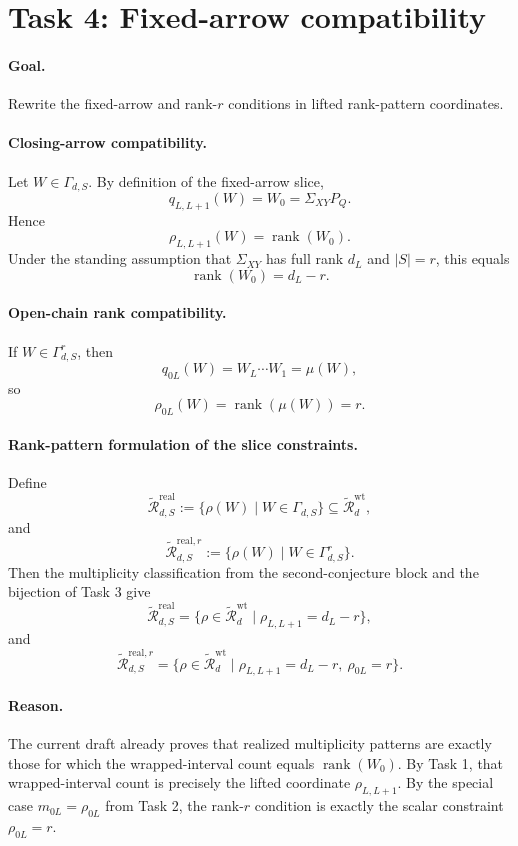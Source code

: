 \section*{Task 4: Fixed-arrow compatibility}

\paragraph{Goal.}
Rewrite the fixed-arrow and rank-\(r\) conditions in lifted rank-pattern
coordinates.

\paragraph{Closing-arrow compatibility.}
Let \(W\in \Gamma_{d,S}\). By definition of the fixed-arrow slice,
\[
q_{L,L+1}(W)=W_0=\Sigma_{XY}P_Q.
\]
Hence
\[
\rho_{L,L+1}(W)=\operatorname{rank}(W_0).
\]
Under the standing assumption that \(\Sigma_{XY}\) has full rank \(d_L\) and
\(|S|=r\), this equals
\[
\operatorname{rank}(W_0)=d_L-r.
\]

\paragraph{Open-chain rank compatibility.}
If \(W\in \Gamma_{d,S}^r\), then
\[
q_{0L}(W)=W_L\cdots W_1=\mu(W),
\]
so
\[
\rho_{0L}(W)=\operatorname{rank}(\mu(W))=r.
\]

\paragraph{Rank-pattern formulation of the slice constraints.}
Define
\[
\widetilde{\mathcal R}_{d,S}^{\mathrm{real}}
:=
\{\rho(W)\mid W\in \Gamma_{d,S}\}
\subseteq
\widetilde{\mathcal R}_d^{\mathrm{wt}},
\]
and
\[
\widetilde{\mathcal R}_{d,S}^{\mathrm{real},r}
:=
\{\rho(W)\mid W\in \Gamma_{d,S}^r\}.
\]
Then the multiplicity classification from the second-conjecture block and the
bijection of Task 3 give
\[
\widetilde{\mathcal R}_{d,S}^{\mathrm{real}}
=
\{\rho\in \widetilde{\mathcal R}_d^{\mathrm{wt}}\mid \rho_{L,L+1}=d_L-r\},
\]
and
\[
\widetilde{\mathcal R}_{d,S}^{\mathrm{real},r}
=
\{\rho\in \widetilde{\mathcal R}_d^{\mathrm{wt}}\mid \rho_{L,L+1}=d_L-r,\ \rho_{0L}=r\}.
\]

\paragraph{Reason.}
The current draft already proves that realized multiplicity patterns are exactly
those for which the wrapped-interval count equals \(\operatorname{rank}(W_0)\).
By Task 1, that wrapped-interval count is precisely the lifted coordinate
\(\rho_{L,L+1}\). By the special case \(m_{0L}=\rho_{0L}\) from Task 2, the
rank-\(r\) condition is exactly the scalar constraint \(\rho_{0L}=r\).

